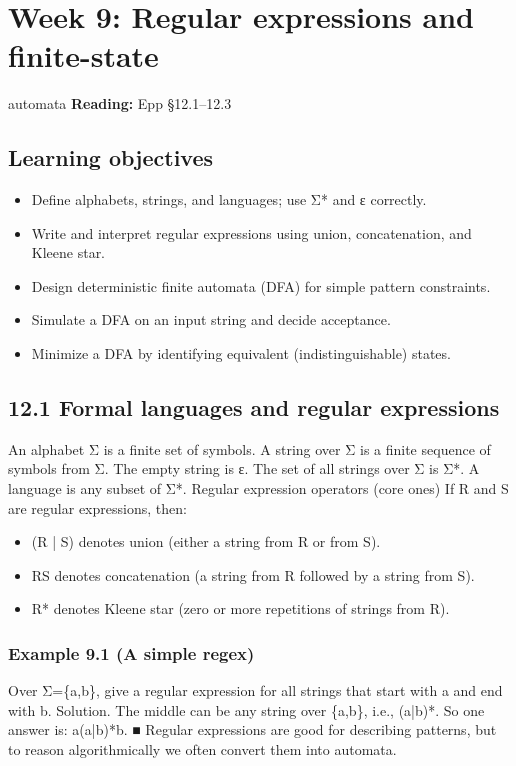 \documentclass[11pt]{article}
\begin{document}
\section{Week 9: Regular expressions and finite-state}
automata
\textbf{Reading:} Epp §12.1–12.3
\subsection*{Learning objectives}
\begin{itemize}[leftmargin=*,itemsep=0.25em]
\item Define alphabets, strings, and languages; use Σ* and ε correctly.
\item Write and interpret regular expressions using union, concatenation, and Kleene star.
\item Design deterministic finite automata (DFA) for simple pattern constraints.
\item Simulate a DFA on an input string and decide acceptance.
\item Minimize a DFA by identifying equivalent (indistinguishable) states.
\end{itemize}
\subsection{12.1 Formal languages and regular expressions}
An alphabet Σ is a finite set of symbols. A string over Σ is a finite sequence of symbols
from Σ. The empty string is ε. The set of all strings over Σ is Σ*. A language is any subset
of Σ*.
Regular expression operators (core ones)
If R and S are regular expressions, then:
\begin{itemize}[leftmargin=*,itemsep=0.25em]
\item (R | S) denotes union (either a string from R or from S).
\item RS denotes concatenation (a string from R followed by a string from S).
\item R* denotes Kleene star (zero or more repetitions of strings from R).
\end{itemize}
\subsubsection*{Example 9.1 (A simple regex)}
Over Σ=\{a,b\}, give a regular expression for all strings that start with a and end
with b.
Solution. The middle can be any string over \{a,b\}, i.e., (a|b)*. So one answer is:
a(a|b)*b. ■
Regular expressions are good for describing patterns, but to reason algorithmically we
often convert them into automata.
\end{document}
